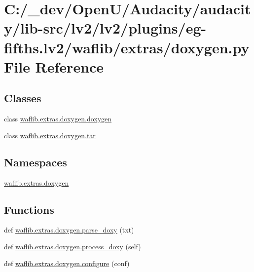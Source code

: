 \hypertarget{lv2_2plugins_2eg-fifths_8lv2_2waflib_2extras_2doxygen_8py}{}\section{C\+:/\+\_\+dev/\+Open\+U/\+Audacity/audacity/lib-\/src/lv2/lv2/plugins/eg-\/fifths.lv2/waflib/extras/doxygen.py File Reference}
\label{lv2_2plugins_2eg-fifths_8lv2_2waflib_2extras_2doxygen_8py}
\subsection*{Classes}
\begin{DoxyCompactItemize}
\item 
class \hyperlink{classwaflib_1_1extras_1_1doxygen_1_1doxygen}{waflib.\+extras.\+doxygen.\+doxygen}
\item 
class \hyperlink{classwaflib_1_1extras_1_1doxygen_1_1tar}{waflib.\+extras.\+doxygen.\+tar}
\end{DoxyCompactItemize}
\subsection*{Namespaces}
\begin{DoxyCompactItemize}
\item 
 \hyperlink{namespacewaflib_1_1extras_1_1doxygen}{waflib.\+extras.\+doxygen}
\end{DoxyCompactItemize}
\subsection*{Functions}
\begin{DoxyCompactItemize}
\item 
def \hyperlink{namespacewaflib_1_1extras_1_1doxygen_ad00d728a0949db6dd441165547e07e7a}{waflib.\+extras.\+doxygen.\+parse\+\_\+doxy} (txt)
\item 
def \hyperlink{namespacewaflib_1_1extras_1_1doxygen_a88b85c6ce6a068c606c3e035e84d8760}{waflib.\+extras.\+doxygen.\+process\+\_\+doxy} (self)
\item 
def \hyperlink{namespacewaflib_1_1extras_1_1doxygen_a172fdeb5aa82f9d3d452b22a5f4abe70}{waflib.\+extras.\+doxygen.\+configure} (conf)
\end{DoxyCompactItemize}
